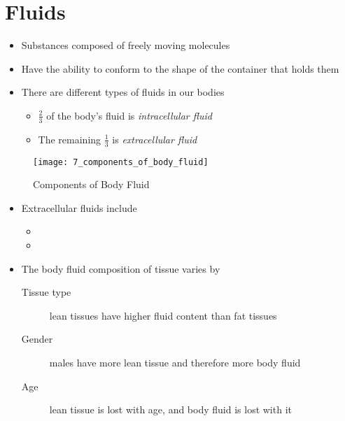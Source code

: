 \documentclass[title={Chapter 7}]{fdsn201notes}
\begin{document}

\section{Fluids}\label{sec:fluids}
\begin{itemize}
	\item Substances composed of freely moving molecules
	\item Have the ability to conform to the shape of the container that holds them
	\item There are different types of fluids in our bodies
	\begin{itemize}
		\item $\frac{2}{3}$ of the body's fluid is \emph{intracellular fluid}
		\item The remaining $\frac{1}{3}$ is \emph{extracellular fluid}
	\end{itemize}
\end{itemize}

\begin{figure}[H]
	\centering
	\texttt{[image: 7\_components\_of\_body\_fluid]}
	\caption{Components of Body Fluid}
	\label{fig:components_of_body_fluid}
\end{figure}

\begin{itemize}
	\item Extracellular fluids include
	\begin{itemize}
		\item {}
		\item {}
	\end{itemize}
	\item The body fluid composition of tissue varies by
	\begin{description}
		\item[Tissue type] lean tissues have higher fluid content than fat tissues
		\item[Gender] males have more lean tissue and therefore more body fluid
		\item[Age] lean tissue is lost with age, and body fluid is lost with it
	\end{description}
\end{itemize}
\end{document}
